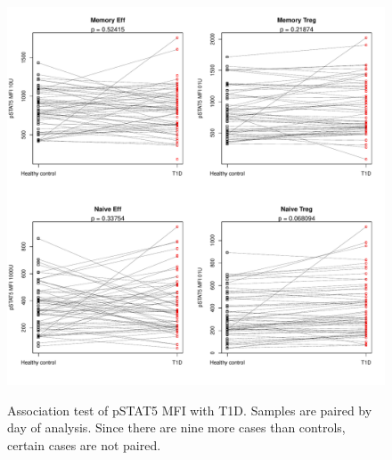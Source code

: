 \chapter{\label{appendix:il2-association}}%


\begin{figure}
\centering
\begin{minipage}{.7\textwidth}
\includegraphics[width=\linewidth]{figures/pstat5-mfi-t1d-celltypes}
\end{minipage}
{ Association test of pSTAT5 MFI with T1D.  }
{
  Samples are paired by day of analysis.
  Since there are nine more cases than controls, certain cases are not paired.
}
\begin{minipage}{.7\textwidth}

\end{minipage}
\end{figure}
